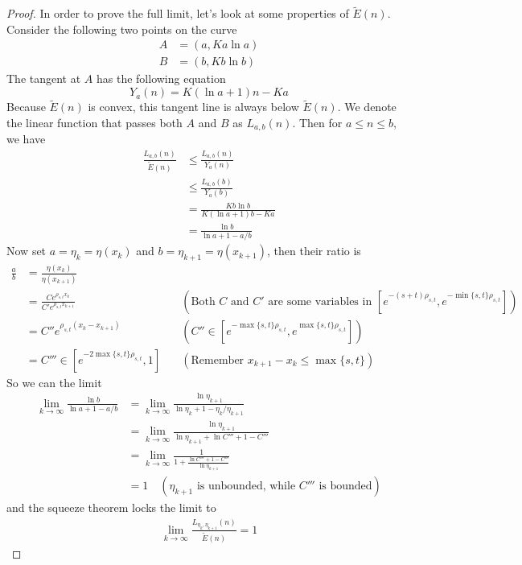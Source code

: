 \documentclass[]{article}
\begin{document}
\begin{proof}
	In order to prove the full limit, let's look at some properties of $\tilde{E}(n)$. Consider the following two points on the curve
	\begin{align*}
	A &= (a, K a\ln a)\\
	B &= (b, K b\ln b)
	\end{align*}
	The tangent at $A$ has the following equation
	\[
	Y_a(n) = K(\ln a + 1)n - Ka
	\]
	Because $\tilde{E}(n)$ is convex, this tangent line is always below $\tilde{E}(n)$. We denote the linear function that passes both $A$ and $B$ as $L_{a,b}(n)$. Then for $a\le n\le b$, we have 
	\begin{align*}
	\frac{L_{a,b}(n)}{\tilde{E}(n)} &\le \frac{L_{a,b}(n)}{Y_a(n)} \\
	&\le \frac{L_{a,b}(b)}{Y_a(b)} \\
	&= \frac{Kb \ln b}{K(\ln a + 1)b - Ka}\\
	&= \frac{\ln b}{\ln a + 1 - a/b}
	\end{align*}
	Now set $a = \eta_{k} = \eta(x_k)$ and $b = \eta_{k+1} = \eta(x_{k+1})$, then their ratio is
	\begin{align*}
	\frac{a}{b} &= \frac{\eta(x_k)}{\eta(x_{k+1})}\\
		&= \frac{C e^{\rho_{s,t} x_k}}{C' e^{\rho_{s,t} x_{k+1}} } \quad &(\text{Both $C$ and $C'$ are some variables in $[e^{-(s+t)\rho_{s,t}},e^{-\min\{s,t\}\rho_{s,t}}]$})\\
		&= C'' e^{\rho_{s,t}(x_k-x_{k+1})} \quad &(C'' \in [e^{-\max\{s,t\}\rho_{s,t}}, e^{\max\{s,t\}\rho_{s,t}}]) \\
		& = C'''\in [e^{-2\max\{s,t\}\rho_{s,t}}, 1] \quad & (\text{Remember $x_{k+1} - x_{k} \le \max\{s,t\}$})
	\end{align*}
	So we can the limit
	\begin{align*}
	\lim_{k\to\infty} \frac{\ln b}{\ln a + 1 - a/b} &= \lim_{k\to\infty} \frac{\ln \eta_{k+1}}{\ln \eta_{k} + 1 - \eta_{k}/\eta_{k+1}}\\
	&= \lim_{k\to\infty} \frac{\ln \eta_{k+1}}{\ln \eta_{k+1} + \ln C''' + 1 - C'''} \\
	&= \lim_{k\to\infty} \frac{1}{1 + \frac{\ln C''' + 1 - C'''}{\ln \eta_{k+1}}} \\
	&= 1 \quad (\text{$\eta_{k+1}$ is unbounded, while $C'''$ is bounded})
	\end{align*}
	and the squeeze theorem locks the limit to 
	\begin{align*}
	\lim_{k\to\infty}\frac{L_{\eta_{k},\eta_{k+1}}(n)}{\tilde{E}(n)} = 1
	\end{align*}

\end{proof}
\end{document}
